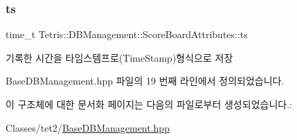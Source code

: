 \subsubsection{\texorpdfstring{ts}{ts}}
{\footnotesize\ttfamily time\+\_\+t Tetris\+::\+D\+B\+Management\+::\+Score\+Board\+Attributes\+::ts}



기록한 시간을 타임스템프로(\+Time\+Stamp)형식으로 저장 



Base\+D\+B\+Management.\+hpp 파일의 19 번째 라인에서 정의되었습니다.



이 구조체에 대한 문서화 페이지는 다음의 파일로부터 생성되었습니다.\+:\begin{DoxyCompactItemize}
\item 
Classes/tet2/\hyperlink{_base_d_b_management_8hpp}{Base\+D\+B\+Management.\+hpp}\end{DoxyCompactItemize}
